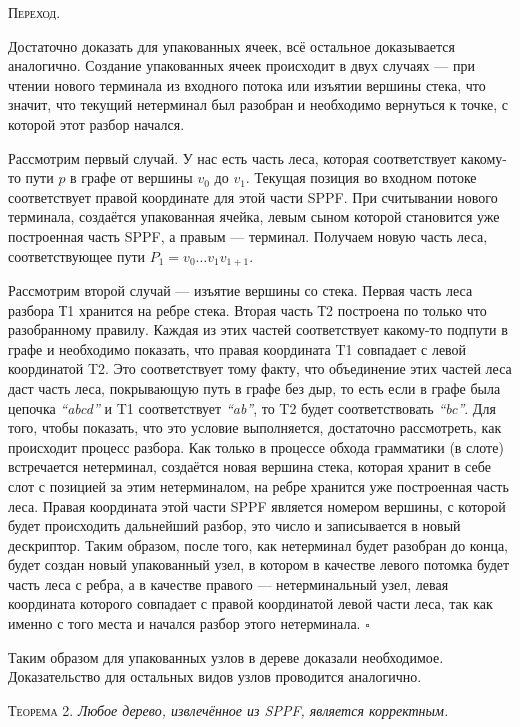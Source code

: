 \documentclass[14pt]{matmex-diploma}
\begin{document}
\textsc{Переход.}

Достаточно доказать для упакованных ячеек, всё остальное доказывается аналогично. Создание упакованных ячеек происходит в двух случаях --- при чтении нового терминала из входного потока или изъятии вершины стека, что значит, что текущий нетерминал был разобран и необходимо вернуться к точке, с которой этот разбор начался. 

Рассмотрим первый случай. У нас есть часть леса, которая соответствует какому-то пути $p$ в графе от вершины $v_0$ до $v_1$. Текущая позиция во входном потоке соответствует правой координате для этой части SPPF. При считывании нового терминала, создаётся упакованная ячейка, левым сыном которой становится уже построенная часть SPPF, а правым --- терминал. Получаем новую часть леса, соответствующее пути $P_1 = v_0 \dots v_1 v_{1+1}$.

Рассмотрим второй случай --- изъятие вершины со стека. Первая часть леса разбора Т1 хранится на ребре стека. Вторая часть Т2 построена по только что разобранному правилу. Каждая из этих частей соответствует какому-то подпути в графе и необходимо показать, что правая координата T1 совпадает с левой координатой T2. Это соответствует тому факту, что объединение этих частей леса даст часть леса, покрывающую путь в графе без дыр, то есть если в графе была цепочка {\it ``abcd''} и T1 соответствует {\it ``ab''}, то T2 будет соответствовать {\it ``bc''}. Для того, чтобы показать, что это условие выполняется, достаточно рассмотреть, как происходит процесс разбора. Как только в процессе обхода грамматики (в слоте) встречается нетерминал, создаётся новая вершина стека, которая хранит в себе слот с позицией за этим нетерминалом, на ребре хранится уже построенная часть леса. Правая координата этой части SPPF является номером вершины, с которой будет происходить дальнейший разбор, это число и записывается в новый дескриптор. Таким образом, после того, как нетерминал будет разобран до конца, будет создан новый упакованный узел, в котором в качестве левого потомка будет часть леса с ребра, а в качестве правого --- нетерминальный узел, левая координата которого совпадает с правой координатой левой части леса, так как именно с того места и начался разбор этого нетерминала. $\square$

Таким образом для упакованных узлов в дереве доказали необходимое. Доказательство для остальных видов узлов проводится аналогично.

\textsc{Теорема 2.} 
\textit{Любое дерево, извлечённое из SPPF, является корректным.}
\end{document}
